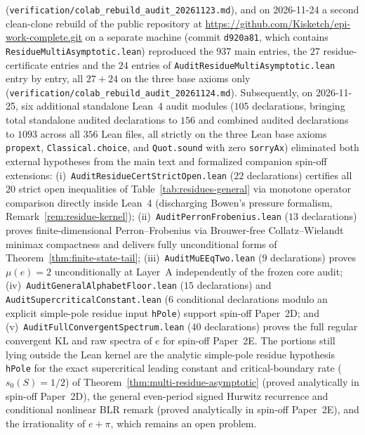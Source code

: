 (\texttt{verification/\allowbreak colab\_\allowbreak rebuild\_\allowbreak audit\_\allowbreak 20261123.md}), and on 2026-11-24 a second clean-clone rebuild of the public repository at \url{https://github.com/Kisketch/epi-work-complete.git} on a separate machine (commit \texttt{d920a81}, which contains \texttt{ResidueMultiAsymptotic.lean}) reproduced the $937$ main entries, the $27$ residue-certificate entries and the $24$ entries of \texttt{AuditResidueMultiAsymptotic.lean} entry by entry, all $27+24$ on the three base axioms only (\texttt{verification/\allowbreak colab\_\allowbreak rebuild\_\allowbreak audit\_\allowbreak 20261124.md}). Subsequently, on 2026-11-25, six additional standalone Lean~4 audit modules ($105$ declarations, bringing total standalone audited declarations to $156$ and combined audited declarations to $1093$ across all $356$ Lean files, all strictly on the three Lean base axioms \texttt{propext}, \texttt{Classical.choice}, and \texttt{Quot.sound} with zero \texttt{sorryAx}) eliminated both external hypotheses from the main text and formalized companion spin-off extensions: (i)~\texttt{AuditResidueCertStrictOpen.lean} ($22$ declarations) certifies all $20$ strict open inequalities of Table~\ref{tab:residues-general} via monotone operator comparison directly inside Lean~4 (discharging Bowen's pressure formalism, Remark~\ref{rem:residue-kernel}); (ii)~\texttt{AuditPerronFrobenius.lean} ($13$ declarations) proves finite-dimensional Perron--Frobenius via Brouwer-free Collatz--Wielandt minimax compactness and delivers fully unconditional forms of Theorem~\ref{thm:finite-state-tail}; (iii)~\texttt{AuditMuEEqTwo.lean} ($9$ declarations) proves $\mu(e)=2$ unconditionally at Layer~A independently of the frozen core audit; (iv)~\texttt{AuditGeneralAlphabetFloor.lean} ($15$ declarations) and \texttt{AuditSupercriticalConstant.lean} ($6$ conditional declarations modulo an explicit simple-pole residue input \texttt{hPole}) support spin-off Paper~2D; and (v)~\texttt{AuditFullConvergentSpectrum.lean} ($40$ declarations) proves the full regular convergent KL and raw spectra of $e$ for spin-off Paper~2E. The portions still lying outside the Lean kernel are the analytic simple-pole residue hypothesis \texttt{hPole} for the exact supercritical leading constant and critical-boundary rate ($s_0(S)=1/2$) of Theorem~\ref{thm:multi-residue-asymptotic} (proved analytically in spin-off Paper~2D), the general even-period signed Hurwitz recurrence and conditional nonlinear BLR remark (proved analytically in spin-off Paper~2E), and the irrationality of $e+\pi$, which remains an open problem.

